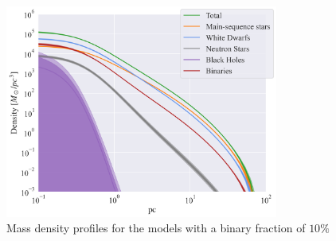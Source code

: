 \begin{figure}
	\centering
	\includegraphics[width=0.8\textwidth]{figures/high_bin_model/density.png}
	\caption{Mass density profiles for the models with a binary fraction of $10\%$}
	\label{fig:highbin_model_densities}
\end{figure}


